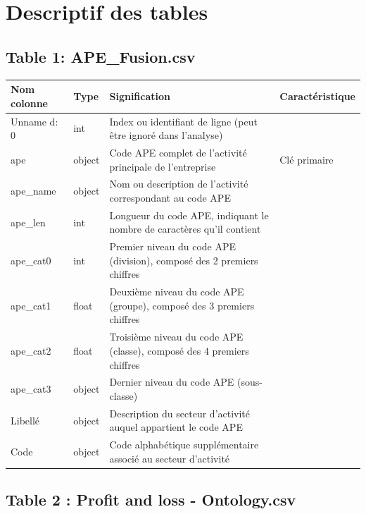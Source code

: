 \documentclass[mstat,12pt]{unswthesis}
\begin{document}
\section{Descriptif des tables}\label{descriptif-des-tables}

\bigskip

\subsection{Table 1: APE\_Fusion.csv}\label{table-1-ape_fusion.csv}

\begin{table}[H]
\centering
\scriptsize
\begin{tabular}{|p{3.2cm}|p{1.2cm}|p{7.5cm}|p{2.5cm}|}
\hline
\textbf{Nom colonne} & \textbf{Type} & \textbf{Signification} & \textbf{Caractéristique} \\
\hline
Unname d: 0 & int & Index ou identifiant de ligne (peut être ignoré dans l'analyse) & \\
\hline
ape & object & Code APE complet de l'activité principale de l'entreprise & Clé primaire \\
\hline
ape\_name & object & Nom ou description de l'activité correspondant au code APE & \\
\hline
ape\_len & int & Longueur du code APE, indiquant le nombre de caractères qu'il contient & \\
\hline
ape\_cat0 & int & Premier niveau du code APE (division), composé des 2 premiers chiffres & \\
\hline
ape\_cat1 & float & Deuxième niveau du code APE (groupe), composé des 3 premiers chiffres & \\
\hline
ape\_cat2 & float & Troisième niveau du code APE (classe), composé des 4 premiers chiffres & \\
\hline
ape\_cat3 & object & Dernier niveau du code APE (sous-classe) & \\
\hline
Libellé & object & Description du secteur d'activité auquel appartient le code APE & \\
\hline
Code & object & Code alphabétique supplémentaire associé au secteur d'activité & \\
\hline
\end{tabular}
\footnotesize
\label{tab:ape_description}
\end{table}

\subsection{Table 2 : Profit and loss -
Ontology.csv}\label{table-2-profit-and-loss---ontology.csv}
\end{document}
